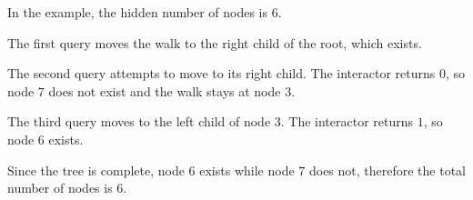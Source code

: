 In the example, the hidden number of nodes is $6$.

The first query moves the walk to the right child of the root, which exists.

The second query attempts to move to its right child. The interactor returns $0$, so node $7$ does not exist and the walk stays at node $3$.

The third query moves to the left child of node $3$. The interactor returns $1$, so node $6$ exists.

Since the tree is complete, node $6$ exists while node $7$ does not, therefore the total number of nodes is $6$.
